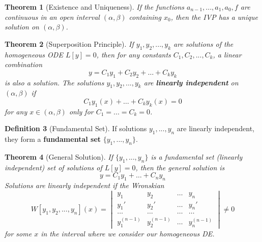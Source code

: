 \documentclass[12pt]{article}
\newtheorem{thm}{Theorem}[section]
\theoremstyle{definition}
\newtheorem{defn}[thm]{Definition}
\theoremstyle{remark}
\numberwithin{equation}{section}
\newcommand\B[1]{\textbf{ #1}}
\begin{document}
\vspace{1cm}


\begin{thm}[Existence and Uniqueness]
        If the functions $a_{n-1},...,a_1,a_0,f$ are continuous in an open interval $(\alpha,\beta)$ containing $x_0$, then the IVP has a unique solution on $(\alpha,\beta)$.
\end{thm}


\vspace{1cm}


\begin{thm}[Superposition Principle]
        If $y_1,y_2,...,y_k$ are solutions of the homogeneous ODE $L[y] = 0$, then for any constants $C_1,C_2,...,C_k$, a linear combination \begin{equation}
                y = C_1y_1+C_2y_2+\hdots + C_ky_k
        \end{equation}
        is also a solution. The solutions $y_1,y_2,...,y_k$ are \B{linearly independent} on $(\alpha,\beta)$ if $$C_1y_1(x)+\hdots+C_ky_k(x) = 0$$ for any $x \in (\alpha,\beta)$ only for $C_1=...=C_k=0$.
\end{thm}


\vspace{1cm}


\begin{defn}[Fundamental Set]
        If solutions $y_1,...,y_n$ are linearly independent, they form a \B{fundamental set} $\{y_1,...,y_n\}$.
\end{defn}


\vspace{1cm}


\begin{thm}[General Solution]
        If $\{y_1,...,y_n\}$ is a fundamental set (linearly independent) set of solutions of $L[y] = 0$, then the general solution is \begin{equation}
                y = C_1y_1 + \hdots + C_ny_n
        \end{equation}
        Solutions are linearly independent if the Wronskian \begin{equation}
                W[y_1,y_2,...,y_n](x) = \begin{vmatrix} y_1 & y_2 & \hdots & y_n \\ y_1' & y_2' & \hdots & y_n' \\ \hdots & \hdots & \hdots & \hdots \\ y_1^{(n-1)} & y_2^{(n-1)} & \hdots & y_n^{(n-1)} \end{vmatrix} \neq 0
        \end{equation}
        for some $x$ in the interval where we consider our homogeneous DE.
\end{thm}
\end{document}

